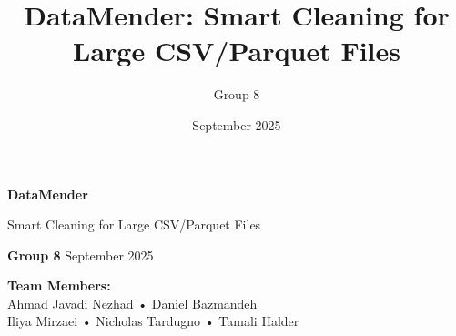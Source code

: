 \documentclass{beamer}
\title{DataMender: Smart Cleaning for Large CSV/Parquet Files}
\author{Group 8}
\institute{Big Data Systems, Algorithms and Networks}
\date{September 2025}
\begin{document}
\begin{frame}[plain]
    \begin{center}
        \vspace{1cm}
        {\huge\color{primaryblue}\textbf{DataMender}}
        
        \vspace{0.5cm}
        {\Large\color{darkgray} Smart Cleaning for Large CSV/Parquet Files}
        
        \vspace{1.5cm}
        
        \vspace{0.8cm}
        {\color{accentgreen}\textbf{Group 8}} \hspace{2cm} {\color{darkgray} September 2025}
        
        \vspace{0.8cm}
        \begin{minipage}{0.9\textwidth}
            \centering
            {\footnotesize\color{darkgray}
            \textbf{Team Members:} \\[0.2cm]
            Ahmad Javadi Nezhad • Daniel Bazmandeh \\
            Iliya Mirzaei • Nicholas Tardugno • Tamali Halder
            }
        \end{minipage}
    \end{center}
\end{frame}
\end{document}
